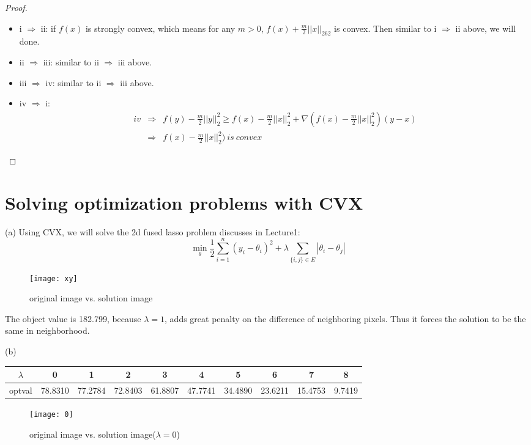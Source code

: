 \documentclass{article}     %
\begin{document}
\begin{proof}
\begin{itemize}
 \item  i $\Rightarrow$ ii: if $f(x)$ is strongly convex, which means for any $m>0$, $f(x)+\frac{m}{2}||x||_262$ is convex. Then similar to i $\Rightarrow$ ii above, we will done.
 \item  ii $\Rightarrow$ iii: similar to ii $\Rightarrow$ iii above.
 \item iii $\Rightarrow$ iv: similar to ii $\Rightarrow$ iii above.
 \item  iv $\Rightarrow$ i:
    \begin{eqnarray*} 
         iv  & \Rightarrow  &f(y)-\frac{m}{2}||y||_2^2\geq f(x)-\frac{m}{2}||x||_2^2+\nabla(f(x)-\frac{m}{2}||x||_2^2)(y-x)\\
        & \Rightarrow & f(x)-\frac{m}{2}||x||_2^2)~is~convex
    \end{eqnarray*}

    \end{itemize}
\end{proof}

\section{Solving optimization problems with CVX}
(a) Using CVX, we will solve the 2d fused lasso problem discusses in Lecture1:
\[\min_{\theta}\frac{1}{2}\sum_{i=1}^{n}(y_i-\theta_i)^2+\lambda\sum_{\{i,j\}\in E}|\theta_i-\theta_j|\]

\begin{figure}[hb]
  \centering
  \texttt{[image: xy]}
  \caption[]
   { original image vs. solution image}
\end{figure}
The object value is 182.799, because $\lambda = 1$, adds great penalty on the difference of neighboring pixels. Thus it forces the solution to be the same in neighborhood.


(b)

\begin{center}
\begin{tabular}{c|c|c|c|c|c|c|c|c|c}
 $\lambda$ & 0 & 1 & 2 & 3 & 4 & 5 & 6 & 7 &8\\
\hline
optval &78.8310 &77.2784 & 72.8403 & 61.8807  & 47.7741 & 34.4890 & 23.6211 & 15.4753 & 9.7419
\end{tabular}
\end{center}

\begin{figure}[H]
  \centering
\texttt{[image: 0]}
  \caption[]
   { original image vs. solution image($\lambda=0$)}
\end{figure}
\end{document}
